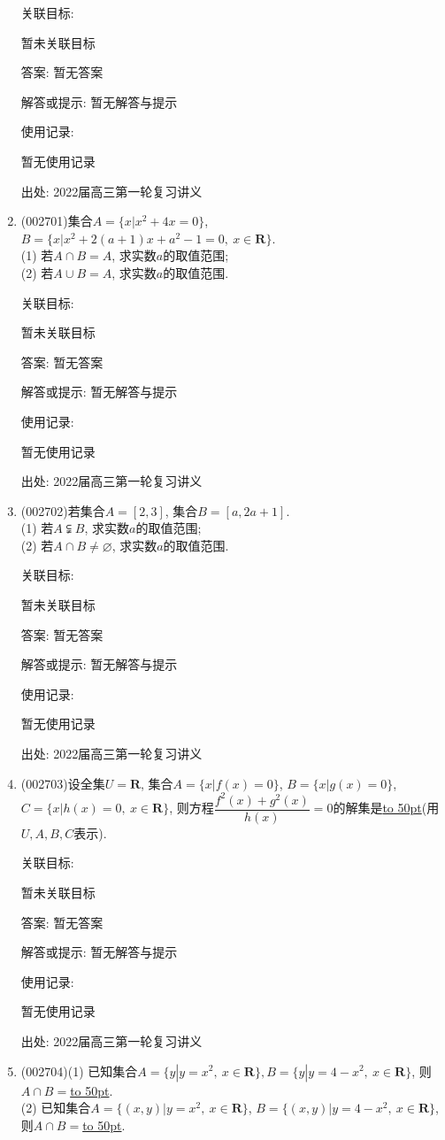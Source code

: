 \documentclass[10pt,a4paper]{article}
\newcommand{\blank}[1]{\underline{\hbox to #1pt{}}}
\begin{document}
\begin{enumerate}[1.]
关联目标:

暂未关联目标

答案: 暂无答案

解答或提示: 暂无解答与提示

使用记录:

暂无使用记录


出处: 2022届高三第一轮复习讲义
\item { (002701)}集合$A=\{x|x^2+4x=0\}$, $B=\{x|x^2+2(a+1)x+a^2-1=0,\ x\in \mathbf{R}\}$.\\
(1) 若$A\cap B=A$, 求实数$a$的取值范围;\\
(2) 若$A\cup B=A$, 求实数$a$的取值范围.


关联目标:

暂未关联目标

答案: 暂无答案

解答或提示: 暂无解答与提示

使用记录:

暂无使用记录


出处: 2022届高三第一轮复习讲义
\item { (002702)}若集合$A=[2,3]$, 集合$B=[a,2a+1]$.\\
(1) 若$A\subsetneqq B$, 求实数$a$的取值范围;\\
(2) 若$A\cap B\ne \varnothing$, 求实数$a$的取值范围.


关联目标:

暂未关联目标

答案: 暂无答案

解答或提示: 暂无解答与提示

使用记录:

暂无使用记录


出处: 2022届高三第一轮复习讲义
\item { (002703)}设全集$U=\mathbf{R}$, 集合$A=\{x|f(x)=0\}$, $B=\{x|g(x)=0\}$, $C=\{x|h(x)=0, \ x\in \mathbf{R}\}$, 则方程$\dfrac{f^2(x)+g^2(x)}{h(x)}=0$的解集是\blank{50}(用$U,A,B,C$表示).


关联目标:

暂未关联目标

答案: 暂无答案

解答或提示: 暂无解答与提示

使用记录:

暂无使用记录


出处: 2022届高三第一轮复习讲义
\item { (002704)}(1) 已知集合$A=\{y|y=x^2, \ x\in \mathbf{R}\}, B=\{y|y=4-x^2, \ x\in \mathbf{R}\}$, 则$A\cap B=$\blank{50}.\\
(2) 已知集合$A=\{(x,y)|y={x^2},\ x\in \mathbf{R}\}$, $B=\{(x,y)|y=4-x^2, \ x\in \mathbf{R}\}$, 则$A\cap B=$\blank{50}.



\end{enumerate}
\end{document}
